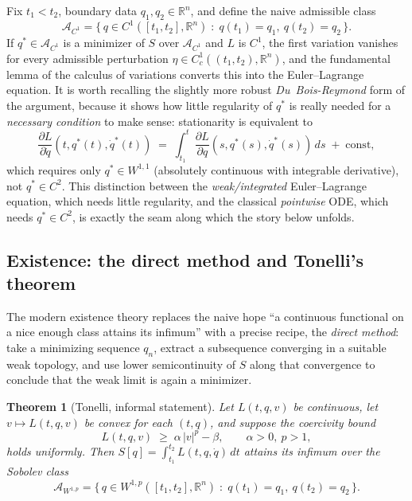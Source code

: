 \documentclass[11pt]{article}
\newtheorem{theorem}{Theorem}[section]
\newcommand{\R}{\mathbb{R}}
\newcommand{\A}{\mathcal{A}}
\begin{document}
Fix $t_1<t_2$, boundary data $q_1,q_2\in\R^n$, and define the naive admissible class
\[
\A_{C^1} = \bigl\{\, q\in C^1([t_1,t_2],\R^n) \;:\; q(t_1)=q_1,\ q(t_2)=q_2 \,\bigr\}.
\]
If $q^\ast\in \A_{C^1}$ is a minimizer of $S$ over $\A_{C^1}$ and $L$ is $C^1$, the first variation vanishes for every admissible perturbation $\eta\in C^1_c((t_1,t_2),\R^n)$, and the fundamental lemma of the calculus of variations converts this into the Euler--Lagrange equation. It is worth recalling the slightly more robust \emph{Du~Bois-Reymond} form of the argument, because it shows how little regularity of $q^\ast$ is really needed for a \emph{necessary condition} to make sense: stationarity is equivalent to
\[
\frac{\partial L}{\partial \dot q}(t,q^\ast(t),\dot q^\ast(t)) \;=\; \int_{t_1}^t \frac{\partial L}{\partial q}(s,q^\ast(s),\dot q^\ast(s))\,ds \;+\; \text{const},
\]
which requires only $q^\ast\in W^{1,1}$ (absolutely continuous with integrable derivative), not $q^\ast\in C^2$. This distinction between the \emph{weak/integrated} Euler--Lagrange equation, which needs little regularity, and the classical \emph{pointwise} ODE, which needs $q^\ast\in C^2$, is exactly the seam along which the story below unfolds.

\subsection{Existence: the direct method and Tonelli's theorem}

The modern existence theory replaces the naive hope ``a continuous functional on a nice enough class attains its infimum'' with a precise recipe, the \emph{direct method}: take a minimizing sequence $q_n$, extract a subsequence converging in a suitable weak topology, and use lower semicontinuity of $S$ along that convergence to conclude that the weak limit is again a minimizer.

\begin{theorem}[Tonelli, informal statement]
\label{thm:tonelli}
Let $L(t,q,v)$ be continuous, let $v\mapsto L(t,q,v)$ be convex for each $(t,q)$, and suppose the coercivity bound
\[
L(t,q,v) \;\ge\; \alpha\,|v|^p - \beta, \qquad \alpha>0,\ p>1,
\]
holds uniformly. Then $S[q]=\int_{t_1}^{t_2}L(t,q,\dot q)\,dt$ attains its infimum over the Sobolev class
\[
\A_{W^{1,p}} = \bigl\{\, q\in W^{1,p}([t_1,t_2],\R^n) \;:\; q(t_1)=q_1,\ q(t_2)=q_2 \,\bigr\}.
\]
\end{theorem}
\end{document}
